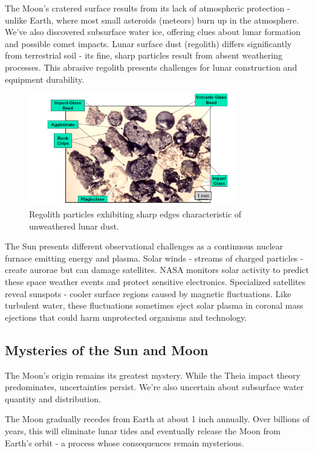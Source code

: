 \documentclass[12pt,oneside,a4paper,english]{article}
\begin{document}
The Moon's cratered surface results from its lack of atmospheric protection - unlike Earth, where most small asteroids (meteors) burn up in the atmosphere. We've also discovered subsurface water ice, offering clues about lunar formation and possible comet impacts. Lunar surface dust (regolith) differs significantly from terrestrial soil - its fine, sharp particles result from absent weathering processes. This abrasive regolith presents challenges for lunar construction and equipment durability.

\begin{figure}[H]
    \centering
    \includegraphics[width=0.8\textwidth]{Regolith.png}
    \caption{Regolith particles exhibiting sharp edges characteristic of unweathered lunar dust.\cite{regolith}}
    \label{fig:regolith}
\end{figure}

The Sun presents different observational challenges as a continuous nuclear furnace emitting energy and plasma. Solar winds - streams of charged particles - create aurorae but can damage satellites. NASA monitors solar activity to predict these space weather events and protect sensitive electronics. Specialized satellites reveal sunspots - cooler surface regions caused by magnetic fluctuations. Like turbulent water, these fluctuations sometimes eject solar plasma in coronal mass ejections that could harm unprotected organisms and technology.\cite{sunspots}

\subsection{Mysteries of the Sun and Moon}
The Moon's origin remains its greatest mystery. While the Theia impact theory predominates, uncertainties persist. We're also uncertain about subsurface water quantity and distribution.

The Moon gradually recedes from Earth at about 1 inch annually. Over billions of years, this will eliminate lunar tides and eventually release the Moon from Earth's orbit - a process whose consequences remain mysterious.
\end{document}

